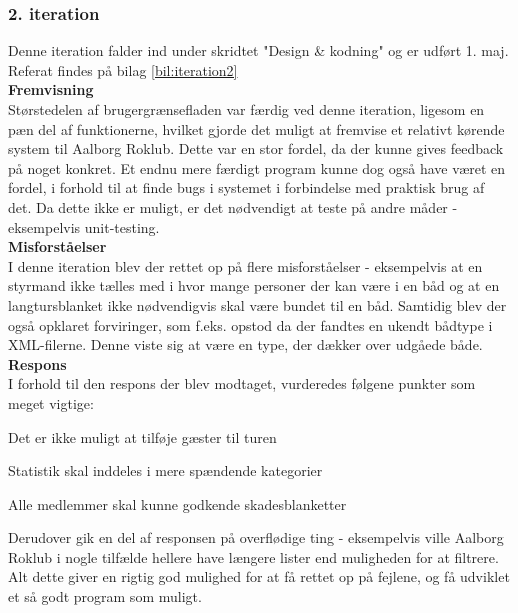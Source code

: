 \subsubsection{2. iteration}
Denne iteration falder ind under skridtet "Design \& kodning" og er udført 1. maj. Referat findes på bilag \ref{bil:iteration2}\\

{\bf Fremvisning}\\
Størstedelen af brugergrænsefladen var færdig ved denne iteration, ligesom en pæn del af funktionerne, hvilket gjorde det muligt at fremvise et relativt kørende system til Aalborg Roklub. Dette var en stor fordel, da der kunne gives feedback på noget konkret. Et endnu mere færdigt program kunne dog også have været en fordel, i forhold til at finde bugs i systemet i forbindelse med praktisk brug af det. Da dette ikke er muligt, er det nødvendigt at teste på andre måder - eksempelvis unit-testing.\\

\textbf{Misforståelser}\\
I denne iteration blev der rettet op på flere misforståelser - eksempelvis at en styrmand ikke tælles med i hvor mange personer der kan være i en båd og at en langtursblanket ikke nødvendigvis skal være bundet til en båd. Samtidig blev der også opklaret forviringer, som f.eks. opstod da der fandtes en ukendt bådtype i XML-filerne. Denne viste sig at være en type, der dækker over udgåede både.\\

{\bf Respons}\\
I forhold til den respons der blev modtaget, vurderedes følgene punkter som meget vigtige:

\begin{itemize_small}
    \item Det er ikke muligt at tilføje gæster til turen
    \item Statistik skal inddeles i mere spændende kategorier
    \item Alle medlemmer skal kunne godkende skadesblanketter
\end{itemize_small}

Derudover gik en del af responsen på overflødige ting - eksempelvis ville Aalborg Roklub i nogle tilfælde hellere have længere lister end muligheden for at filtrere. Alt dette giver en rigtig god mulighed for at få rettet op på fejlene, og få udviklet et så godt program som muligt.